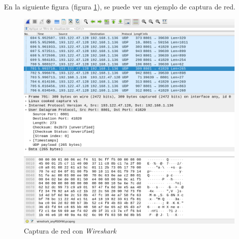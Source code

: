 En la siguiente figura (figura \ref{fig:wire-example}), se puede ver un ejemplo de captura de red.

\begin{figure}[h]
    \centering
    \includegraphics[width=1.0\textwidth]{images/sections/tools/wire-example.png}
    \caption{Captura de red con \textit{Wireshark}}
    \label{fig:wire-example}
\end{figure}